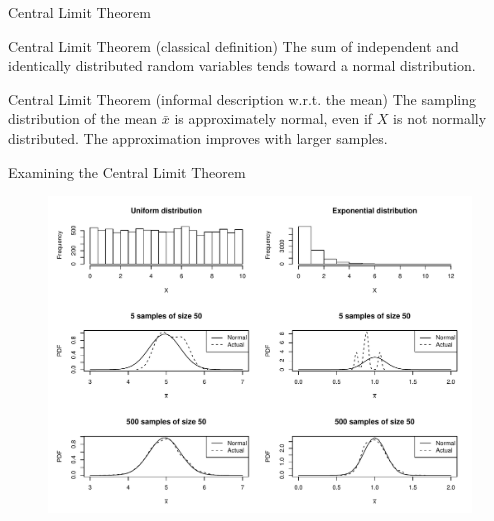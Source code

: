 \begin{frame}{Central Limit Theorem}

    \begin{block}{Central Limit Theorem (classical definition)}
        \medskip
        The sum of independent and identically distributed random variables tends toward a normal distribution.
    \end{block}

    \medskip
    \begin{block}{Central Limit Theorem (informal description w.r.t. the mean)}
        \medskip
        The sampling distribution of the mean $\bar{x}$ is approximately normal, even if $X$ is not normally distributed. The approximation improves with larger samples.
    \end{block}

\end{frame}

\begin{frame}{Examining the Central Limit Theorem}

    \begin{figure}
        \includegraphics[width=\linewidth]{R/plots/central-limit-theorem}
    \end{figure}

\end{frame}

